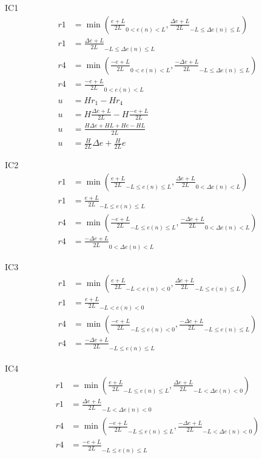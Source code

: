 IC1 
\begin{equation}
\begin{split}
    r1&=\min{\left(\frac{e+L}{2L}_{0<e(n)<L},\frac{\Delta e+L}{2L}_{-L\leq\Delta e(n)\leq L}\right)}\\
    r1&=\frac{\Delta e+L}{2L}_{-L\leq\Delta e(n)\leq L}\\
    r4&=\min{\left(\frac{-e+L}{2L}_{0<e(n)<L},\frac{-\Delta e+L}{2L}_{-L\leq\Delta e(n)\leq L}\right)}\\
    r4&=\frac{-e+L}{2L}_{0<e(n)<L}\\
    u&=Hr_1-Hr_4\\
    u&=H\frac{\Delta e+L}{2L}-H\frac{-e+L}{2L}\\
    u&=\frac{H\Delta e+HL+He-HL}{2L}\\
    u&=\frac{H}{2L}\Delta e+\frac{H}{2L}e
\end{split}
\end{equation}

IC2
\begin{equation}
\begin{split}
    r1&=\min{\left(\frac{e+L}{2L}_{-L\leq e(n)\leq L},\frac{\Delta e+L}{2L}_{0<\Delta e(n)<L}\right)}\\
    r1&=\frac{e+L}{2L}_{-L\leq e(n)\leq L}\\
    r4&=\min{\left(\frac{-e+L}{2L}_{-L\leq e(n)\leq L},\frac{-\Delta e+L}{2L}_{0<\Delta e(n)<L}\right)}\\
    r4&=\frac{-\Delta e+L}{2L}_{0<\Delta e(n)<L}
\end{split}
\end{equation}


IC3
\begin{equation}
\begin{split}
    r1&=\min{\left(\frac{e+L}{2L}_{-L<e(n)<0},\frac{\Delta e+L}{2L}_{-L\leq e(n)\leq L}\right)}\\
    r1&=\frac{e+L}{2L}_{-L<e(n)<0}\\
    r4&=\min{\left(\frac{-e+L}{2L}_{-L\leq e(n)<0},\frac{-\Delta e+L}{2L}_{-L\leq e(n)\leq L}\right)}\\
    r4&=\frac{-\Delta e+L}{2L}_{-L\leq e(n)\leq L}
\end{split}
\end{equation}

IC4
\begin{equation}
\begin{split}
    r1&=\min{\left(\frac{e+L}{2L}_{-L\leq e(n)\leq L},\frac{\Delta e+L}{2L}_{-L<\Delta e(n)<0}\right)}\\
    r1&=\frac{\Delta e+L}{2L}_{-L<\Delta e(n)<0}\\
    r4&=\min{\left(\frac{-e+L}{2L}_{-L\leq e(n)\leq L},\frac{-\Delta e+L}{2L}_{-L<\Delta e(n)<0}\right)}\\
    r4&=\frac{-e+L}{2L}_{-L\leq e(n)\leq L}
\end{split}
\end{equation}

